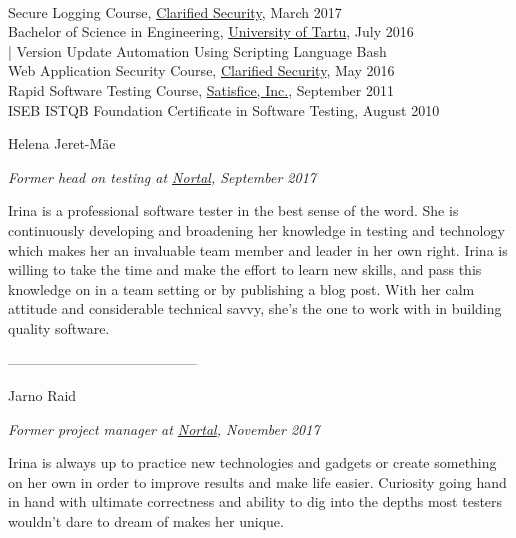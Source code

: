 \documentclass[a4paper, 12pt]{article}
\begin{document}
\\
Secure Logging Course, \href{https://clarifiedsecurity.com/secure-logging-training/}{Clarified Security}, March 2017\\
Bachelor of Science in Engineering, \href{https://www.ut.ee/en}{University of Tartu}, July 2016\\
\indent | Version Update Automation Using Scripting Language Bash\\
Web Application Security Course, \href{https://www.clarifiedsecurity.com/web-application-security-training/}{Clarified Security}, May 2016\\
Rapid Software Testing Course, \href{http://www.satisfice.com/info_rst.shtml}{Satisfice, Inc.}, September 2011\\
ISEB ISTQB Foundation Certificate in Software Testing, August 2010
\pagestyle{empty}

\newpage

\begin{center}
\LARGE{Helena Jeret-Mäe}
\end{center}

\begin{center}
\textit{Former head on testing at \href{https://nortal.com}{Nortal}, September 2017}
\end{center}

Irina is a professional software tester in the best sense of the word. She is continuously developing and broadening her knowledge in testing and technology which makes her an invaluable team member and leader in her own right. Irina is willing to take the time and make the effort to learn new skills, and pass this knowledge on in a team setting or by publishing a blog post. With her calm attitude and considerable technical savvy, she's the one to work with in building quality software.

\begin{center}
\------------------------------------------
\end{center}

\begin{center}
\LARGE{Jarno Raid}
\end{center}

\begin{center}
\textit{Former project manager at \href{https://nortal.com}{Nortal}, November 2017}
\end{center}

Irina is always up to practice new technologies and gadgets or create something on her own in order to improve results and make life easier. Curiosity going hand in hand with ultimate correctness and ability to dig into the depths most testers wouldn't dare to dream of makes her unique.
\end{document}
